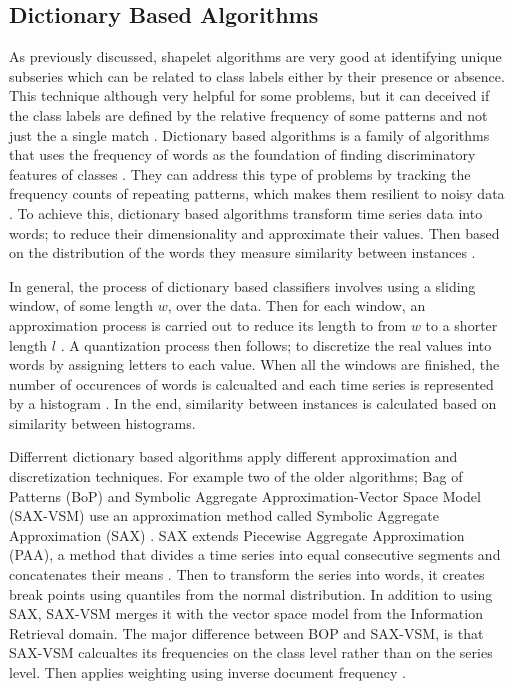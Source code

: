 \subsection{Dictionary Based Algorithms}
\label{SubsectionDictionary}
As previously discussed, shapelet algorithms are very good at identifying unique subseries which can be related to class labels either by their presence or absence.
This technique although very helpful for some problems, but it can deceived if the class labels are defined by the relative frequency of some patterns and not just the a single match \cite{large2018bop,bagnall2017great}.
Dictionary based algorithms is a family of algorithms that uses the frequency of words as the foundation of finding discriminatory features of classes \cite{middlehurst2019scalable}.
They can address this type of problems by tracking the frequency counts of repeating patterns, which makes them resilient to noisy data \cite{shifaz2020ts}.
To achieve this, dictionary based algorithms transform time series data into words; to reduce their dimensionality and approximate their values.
Then based on the distribution of the words they measure similarity between instances \cite{lin2012rotation,schafer2015boss}.

In general, the process of dictionary based classifiers involves using a sliding window, of some length $w$, over the data.
Then for each window, an approximation process is carried out to reduce its length to from $w$ to a shorter length $l$ \cite{bagnall2020tale}.
A quantization process then follows; to discretize the real values into words by assigning letters to each value.
When all the windows are finished, the number of occurences of words is calcualted and each time series is represented by a histogram \cite{shifaz2020ts}.
In the end, similarity between instances is calculated based on similarity between histograms.

Differrent dictionary based algorithms apply different approximation and discretization techniques.
For example two of the older algorithms; Bag of Patterns (BoP) \cite{lin2012rotation} and Symbolic Aggregate Approximation-Vector Space Model (SAX-VSM) \cite{senin2013sax}
use an approximation method called Symbolic Aggregate Approximation (SAX) \cite{lin2007experiencing}.
SAX extends Piecewise Aggregate Approximation (PAA), a method that divides a time series into equal consecutive segments and concatenates their means \cite{shifaz2020ts}.
Then to transform the series into words, it creates break points using quantiles from the normal distribution.
In addition to using SAX, SAX-VSM merges it with the vector space model from the Information Retrieval domain.
The major difference between BOP and SAX-VSM, is that SAX-VSM calcualtes its frequencies on the class level rather than on the series level.
Then applies weighting using inverse document frequency \cite{bagnall2017great}.

